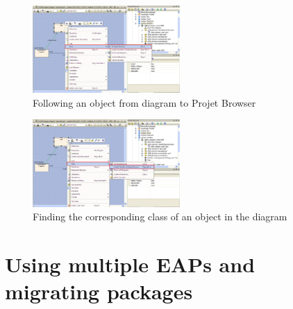 \begin{enumerate}
\begin{figure}[htbp]
\begin{center}
  \includegraphics[width=0.5\textwidth]{pics/tricks/search/search5}
  \caption{Following an object from diagram to Projet Browser}  
  \label{fig_search05}
\end{center}
\end{figure}


\begin{figure}[htbp]
\begin{center}
  \includegraphics[width=0.5\textwidth]{pics/tricks/search/search6}
  \caption{Finding the corresponding class of an object in the diagram}  
  \label{fig_search06}
\end{center}
\end{figure}

\end{enumerate}


\section{Using multiple EAPs and migrating packages} 

